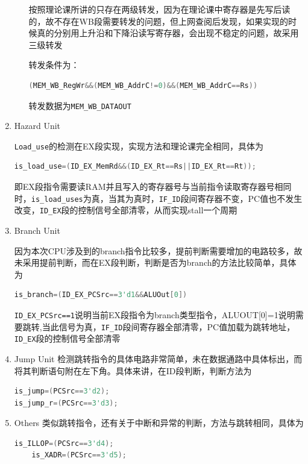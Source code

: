 \documentclass{ctexart}
\begin{document}
\begin{enumerate}
\begin{enumerate}
按照理论课所讲的只存在两级转发，因为在理论课中寄存器是先写后读的，故不存在WB段需要转发的问题，但上网查阅后发现，如果实现的时候真的分别用上升沿和下降沿读写寄存器，会出现不稳定的问题，故采用三级转发

转发条件为：
\begin{lstlisting}[language = verilog]
(MEM_WB_RegWr&&(MEM_WB_AddrC!=0)&&(MEM_WB_AddrC==Rs))
\end{lstlisting}
转发数据为\verb"MEM_WB_DATAOUT"

\end{enumerate}
	
	\item Hazard Unit

\verb"Load_use"的检测在EX段实现，实现方法和理论课完全相同，具体为
\begin{lstlisting}[language = verilog]
 is_load_use=(ID_EX_MemRd&&(ID_EX_Rt==Rs||ID_EX_Rt==Rt));
\end{lstlisting}

即EX段指令需要读RAM并且写入的寄存器号与当前指令读取寄存器号相同时，\verb"is_load_uses"为真，当其为真时，\verb"IF_ID"段间寄存器不变，PC值也不发生改变，\verb"ID_EX"段的控制信号全部清零，从而实现stall一个周期

	\item Branch Unit

因为本次CPU涉及到的branch指令比较多，提前判断需要增加的电路较多，故未采用提前判断，而在EX段判断，判断是否为branch的方法比较简单，具体为

\begin{lstlisting}[language = verilog]
is_branch=(ID_EX_PCSrc==3'd1&&ALUOut[0])
\end{lstlisting}

\verb"ID_EX_PCSrc==1"说明当前EX段指令为branch类型指令，ALUOUT[0]=1说明需要跳转,当此信号为真，\verb"IF_ID"段间寄存器全部清零，PC值加载为跳转地址，\verb"ID_EX"段的控制信号全部清零

	\item Jump Unit
检测跳转指令的具体电路非常简单，未在数据通路中具体标出，而将其判断语句附在左下角。具体来讲，在ID段判断，判断方法为

\begin{lstlisting}[language = verilog]
is_jump=(PCSrc==3'd2);
is_jump_r=(PCSrc==3'd3);
\end{lstlisting}

	\item Others
	类似跳转指令，还有关于中断和异常的判断，方法与跳转相同，具体为

\begin{lstlisting}[language = verilog]
	is_ILLOP=(PCSrc==3'd4);
	is_XADR=(PCSrc==3'd5);
\end{lstlisting}


\end{enumerate}
\end{document}
